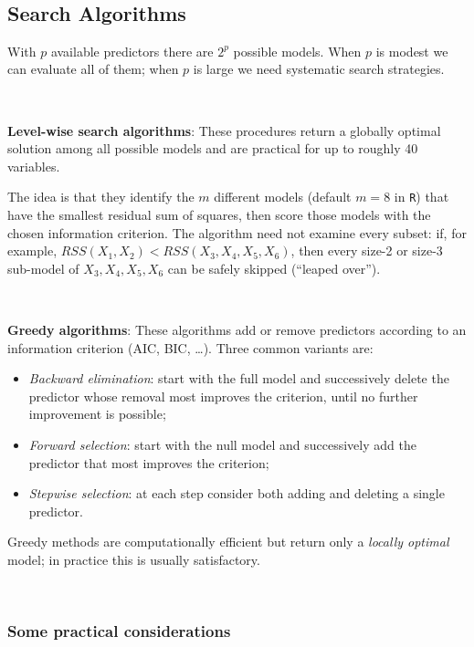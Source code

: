 \documentclass[
]{book}
\begin{document}
~

\subsection{Search Algorithms}\label{search-algorithms}

With \(p\) available predictors there are \(2^p\) possible models. When \(p\) is modest we can evaluate all of them; when \(p\) is large we need systematic search strategies.

~

\textbf{Level-wise search algorithms}: These procedures return a globally optimal solution among all possible models and are practical for up to roughly 40 variables.
~

The idea is that they identify the \(m\) different models (default \(m=8\) in \texttt{R}) that have the smallest residual sum of squares, then score those models with the chosen information criterion. The algorithm need not examine every subset: if, for example, \(RSS(X_1,X_2)<RSS(X_3,X_4,X_5,X_6)\), then every size-2 or size-3 sub-model of \({X_3,X_4,X_5,X_6}\) can be safely skipped (``leaped over'').

~

\textbf{Greedy algorithms}: These algorithms add or remove predictors according to an information criterion (AIC, BIC, \ldots). Three common variants are:

\begin{itemize}
\item
  \emph{Backward elimination}: start with the full model and successively delete the predictor whose removal most improves the criterion, until no further improvement is possible;
\item
  \emph{Forward selection}: start with the null model and successively add the predictor that most improves the criterion;
\item
  \emph{Stepwise selection}: at each step consider both adding and deleting a single predictor.
\end{itemize}

Greedy methods are computationally efficient but return only a \emph{locally optimal} model; in practice this is usually satisfactory.

~

\subsubsection*{Some practical considerations}\label{some-practical-considerations}
\end{document}
